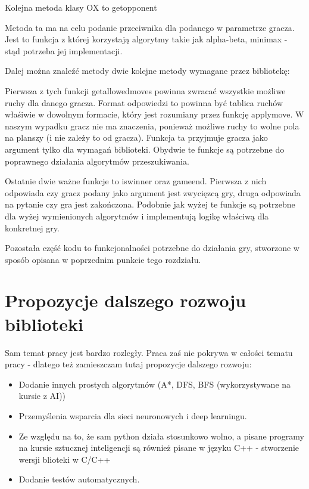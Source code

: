 \documentclass[polish,shortabstract,inz]{iithesis}
\begin{document}
Kolejna metoda klasy OX to get\textunderscore opponent

Metoda ta ma na celu podanie przeciwnika dla podanego w parametrze gracza.
Jest to funkcja z której korzystają algorytmy takie jak alpha-beta, minimax - stąd potrzeba jej implementacji.

Dalej można znaleźć metody dwie kolejne metody wymagane przez bibliotekę:


Pierwsza z tych funkcji get\textunderscore allowed\textunderscore moves powinna zwracać wszystkie możliwe ruchy dla danego gracza.
Format odpowiedzi to powinna być tablica ruchów właśiwie w dowolnym formacie, który jest rozumiany przez funkcję apply\textunderscore move.
W naszym wypadku gracz nie ma znaczenia, ponieważ możliwe ruchy to wolne pola na planszy (i nie zależy to od gracza).
Funkcja ta przyjmuje gracza jako argument tylko dla wymagań biblioteki.
Obydwie te funkcje są potrzebne do poprawnego działania algorytmów przeszukiwania.

Ostatnie dwie ważne funkcje to is\textunderscore winner oraz game\textunderscore end.
Pierwsza z nich odpowiada czy gracz podany jako argument jest zwycięzcą gry, druga odpowiada na pytanie czy gra jest zakończona.
Podobnie jak wyżej te funkcje są potrzebne dla wyżej wymienionych algorytmów i implementują logikę właściwą dla konkretnej gry.

Pozostała część kodu to funkcjonalności potrzebne do działania gry, stworzone w sposób opisana w poprzednim punkcie tego rozdziału.

\section{Propozycje dalszego rozwoju biblioteki}
Sam temat pracy jest bardzo rozległy.
Praca zaś nie pokrywa w całości tematu pracy - dlatego też zamieszczam tutaj propozycje dalszego rozwoju:
\begin{itemize}
  \item Dodanie innych prostych algorytmów (A*, DFS, BFS (wykorzystywane na kursie z AI))
  \item Przemyślenia wsparcia dla sieci neuronowych i deep learningu.
  \item Ze względu na to, że sam python działa stosunkowo wolno, a pisane programy na kursie sztucznej inteligencji są również pisane w języku C++ - stworzenie wersji blioteki w C/C++
  \item Dodanie testów automatycznych.
\end{itemize}
\end{document}
